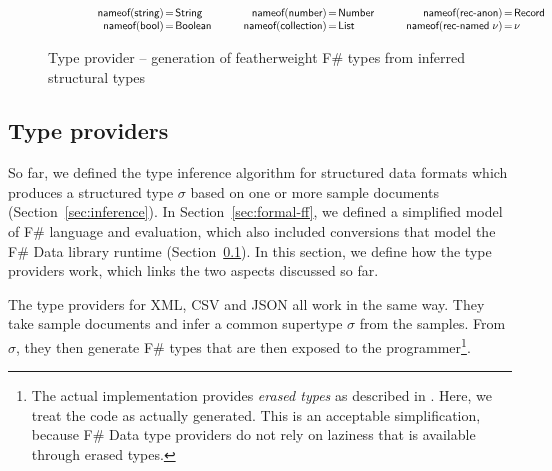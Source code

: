 \documentclass[preprint]{sigplanconf}
\newcommand{\ident}[1]{\textnormal{\sffamily #1}}
\newcommand{\narrow}[1]{\hspace{-0.85em} #1 \hspace{-0.85em}}
\newcommand{\nameoftag}{\ident{nameof}}
\begin{document}
\begin{figure}
\vspace{-0.5em}
\noindent
\begin{equation*}
\qquad
\qquad
\begin{array}{rcl}
 \nameoftag(\ident{string}) &\narrow{=}& \ident{String} \\
 \nameoftag(\ident{bool}) &\narrow{=}& \ident{Boolean} \\
\end{array}
\qquad
\begin{array}{rcl}
 \nameoftag(\ident{number}) &\narrow{=}& \ident{Number} \\
 \nameoftag(\ident{collection}) &\narrow{=}& \ident{List} \\
\end{array}
\qquad
\begin{array}{rcl}
 \nameoftag(\ident{rec-anon}) &\narrow{=}& \ident{Record} \\
 \nameoftag(\ident{rec-named}\;\nu) &\narrow{=}& \nu \\
\end{array}
\end{equation*}

\caption{Type provider -- generation of featherweight F\# types from inferred structural types}
\label{fig:tp-generation}
\vspace{-0.5em}
\end{figure}


\subsection{Type providers}
\label{sec:formal-tp}

So far, we defined the type inference algorithm for structured data formats which produces a structured
type $\sigma$ based on one or more sample documents (Section~\ref{sec:inference}). In Section~\ref{sec:formal-ff},
we defined a simplified model of F\# language and evaluation, which also included conversions that
model the F\# Data library runtime (Section~\ref{sec:formal-tp}). In this section, we define how
the type providers work, which links the two aspects discussed so far.

The type providers for XML, CSV and JSON all work in the same way. They take sample documents and infer a common
supertype $\sigma$ from the samples. From $\sigma$, they then generate F\# types that are then exposed to the
programmer\footnote{The actual implementation provides \emph{erased types} as described in \cite{fsharp-typeprov}. 
Here, we treat the code as actually generated. This is an acceptable simplification, because F\# Data type providers do not 
rely on laziness that is available through erased types.}. 
\end{document}
